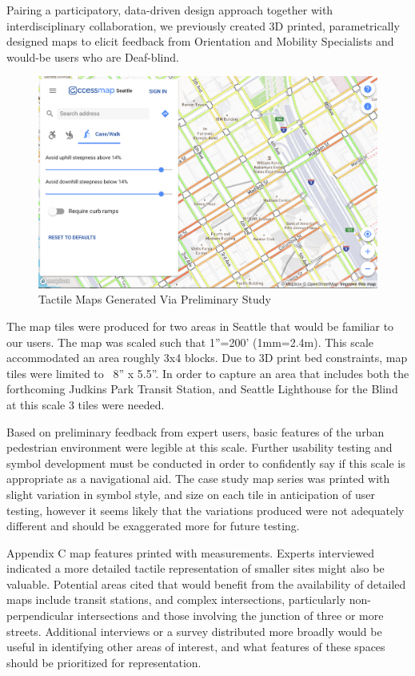 Pairing a participatory, data-driven design approach together with interdisciplinary collaboration, we previously created 3D printed, parametrically designed maps to elicit feedback from Orientation and Mobility Specialists and would-be users who are Deaf-blind.


\begin{figure}
    \centering
    \includegraphics[width=5in]{pics/accessmap.png}
    \caption{Tactile Maps Generated Via Preliminary Study}
    \label{fig:pilot}
\end{figure}


The map tiles were produced for two areas in Seattle that would be familiar to our users. The map was scaled such that 1”=200’ (1mm=2.4m).  This scale accommodated an area roughly 3x4 blocks.   
Due to 3D print bed constraints, map tiles were limited to ~8” x 5.5”. In order to capture an area that includes both the forthcoming Judkins Park Transit Station, and Seattle Lighthouse for the Blind at this scale 3 tiles were needed.   

Based on preliminary feedback from expert users, basic features of the urban pedestrian environment were legible at this scale.  Further usability testing and symbol development must be conducted in order to confidently say if this scale is appropriate as a navigational aid.   The case study map series was printed with slight variation in symbol style, and size on each tile in anticipation of user testing, however it seems likely that the variations produced were not adequately different and should be exaggerated more for future testing.

Appendix C map features printed with measurements.
Experts interviewed indicated a more detailed tactile representation of smaller sites might also be valuable.  Potential areas cited that would benefit from the availability of detailed maps include transit stations, and complex intersections, particularly non-perpendicular intersections and those involving the junction of three or more streets.  Additional interviews or a survey distributed more broadly would be useful in identifying other areas of interest, and what features of these spaces should be prioritized for representation.  


